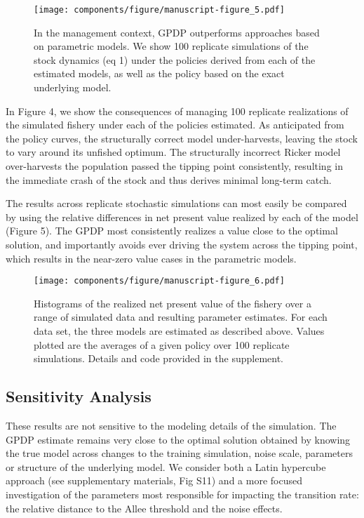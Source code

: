 \documentclass[author-year, 12pt,review]{components/elsarticle} %
\makeatletter
\def\maxwidth{\ifdim\Gin@nat@width>\linewidth\linewidth
\else\Gin@nat@width\fi}
\let\Oldincludegraphics\includegraphics
\renewcommand{\includegraphics}[1]{\Oldincludegraphics[width=\maxwidth]{#1}}
\makeatother
\begin{document}
\begin{figure}[htbp]
\centering
\texttt{[image: components/figure/manuscript-figure\_5.pdf]}
\caption{In the management context, GPDP outperforms approaches based on
parametric models. We show 100 replicate simulations of the stock
dynamics (eq 1) under the policies derived from each of the estimated
models, as well as the policy based on the exact underlying model.}
\end{figure}

In Figure 4, we show the consequences of managing 100 replicate
realizations of the simulated fishery under each of the policies
estimated. As anticipated from the policy curves, the structurally
correct model under-harvests, leaving the stock to vary around its
unfished optimum. The structurally incorrect Ricker model over-harvests
the population passed the tipping point consistently, resulting in the
immediate crash of the stock and thus derives minimal long-term catch.

The results across replicate stochastic simulations can most easily be
compared by using the relative differences in net present value realized
by each of the model (Figure 5). The GPDP most consistently realizes a
value close to the optimal solution, and importantly avoids ever driving
the system across the tipping point, which results in the near-zero
value cases in the parametric models.

\begin{figure}[htbp]
\centering
\texttt{[image: components/figure/manuscript-figure\_6.pdf]}
\caption{Histograms of the realized net present value of the fishery
over a range of simulated data and resulting parameter estimates. For
each data set, the three models are estimated as described above. Values
plotted are the averages of a given policy over 100 replicate
simulations. Details and code provided in the supplement.}
\end{figure}

\subsection{Sensitivity Analysis}\label{sensitivity-analysis}

These results are not sensitive to the modeling details of the
simulation. The GPDP estimate remains very close to the optimal solution
obtained by knowing the true model across changes to the training
simulation, noise scale, parameters or structure of the underlying
model. We consider both a Latin hypercube approach (see supplementary
materials, Fig S11) and a more focused investigation of the parameters
most responsible for impacting the transition rate: the relative
distance to the Allee threshold and the noise effects.
\end{document}
